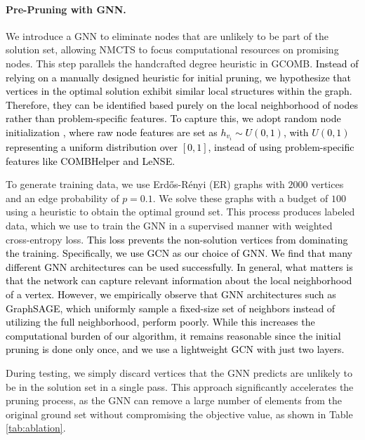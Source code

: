 \documentclass[letterpaper]{article} %
\begin{document}
\paragraph{Pre-Pruning with GNN.} We introduce a GNN to eliminate nodes that are unlikely to be part of the solution set, allowing NMCTS to focus computational resources on promising nodes. This step parallels the handcrafted degree heuristic in GCOMB. \textcolor{black}{ Instead of relying on a manually designed heuristic for initial pruning, we hypothesize that vertices in the optimal solution exhibit similar local structures within the graph. Therefore, they can be identified based purely on the local neighborhood of nodes rather than problem-specific features. To capture this, we adopt random node initialization \cite{abboud2020surprising}, where raw node features are set as \( h_{v_i} \sim U(0,1) \), with \( U(0,1) \) representing a uniform distribution over \([0,1]\), instead of using problem-specific features like COMBHelper and LeNSE.}

To generate training data, we use Erd{\H{o}}s-R{\'e}nyi  \citep{erdos1960evolution} (ER) graphs with $2000$ vertices and an edge probability of 
\( p = 0.1 \). We solve these graphs with a budget of $100$ using a heuristic to obtain the optimal ground set. This process produces labeled data, which we use to train the GNN in a supervised manner with weighted cross-entropy loss. \textcolor{black}{This loss prevents the non-solution vertices from dominating the training. Specifically, we use GCN as our choice of GNN. We find that many different GNN architectures can be used successfully. In general, what matters is that the network can capture relevant information about the local neighborhood of a vertex. However, we empirically observe that GNN architectures such as GraphSAGE, which uniformly sample a fixed-size set of neighbors instead of utilizing the full neighborhood, perform poorly. While this increases the computational burden of our algorithm, it remains reasonable since the initial pruning is done only once, and we use a lightweight GCN with just two layers.}

During testing, we simply discard vertices that the GNN predicts are unlikely to be in the solution set in a single pass. This approach significantly accelerates the pruning process, as the GNN can remove a large number of elements from the original ground set without compromising the objective value, as shown in Table \ref{tab:ablation}.
  
\end{document}
